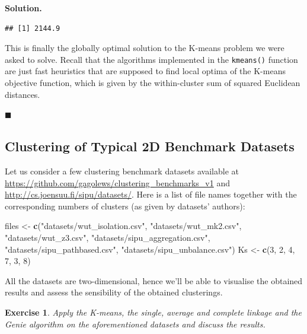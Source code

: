 \documentclass[10pt,b5paper,krantz1]{krantz}
\newenvironment{Shaded}{\begin{snugshade}}{\end{snugshade}}
\newcommand{\DecValTok}[1]{\textcolor[rgb]{0.06,0.06,0.06}{#1}}
\newcommand{\KeywordTok}[1]{\textcolor[rgb]{0.27,0.27,0.27}{\textbf{#1}}}
\newcommand{\NormalTok}[1]{#1}
\newcommand{\StringTok}[1]{\textcolor[rgb]{0.5,0.5,0.5}{#1}}
\newtheorem{exercise}{Exercise}[chapter]
\newenvironment{solution}{%
\bigskip\noindent\textbf{Solution. }%
\it\ignorespaces%
\ignorespaces%
}{\ignorespaces%
\hfill$\blacksquare$%
}
\begin{document}
\begin{solution}
\begin{verbatim}
## [1] 2144.9
\end{verbatim}

This is finally the globally optimal solution to the K-means problem
we were asked to solve. Recall that the algorithms implemented in the \texttt{kmeans()}
function are just fast heuristics that are supposed to find
local optima of the K-means objective function, which is given
by the within-cluster sum of squared Euclidean distances.

\end{solution}

\hypertarget{clustering-of-typical-2d-benchmark-datasets}{%
\subsection{Clustering of Typical 2D Benchmark Datasets}\label{clustering-of-typical-2d-benchmark-datasets}}

Let us consider a few clustering benchmark datasets
available at \url{https://github.com/gagolews/clustering_benchmarks_v1}
and \url{http://cs.joensuu.fi/sipu/datasets/}.
Here is a list of file names together with the
corresponding numbers of clusters (as given by datasets' authors):

\begin{Shaded}
\begin{Highlighting}[]
\NormalTok{files <-}\StringTok{ }\KeywordTok{c}\NormalTok{(}\StringTok{"datasets/wut_isolation.csv"}\NormalTok{,}
           \StringTok{"datasets/wut_mk2.csv"}\NormalTok{,}
           \StringTok{"datasets/wut_z3.csv"}\NormalTok{,}
           \StringTok{"datasets/sipu_aggregation.csv"}\NormalTok{,}
           \StringTok{"datasets/sipu_pathbased.csv"}\NormalTok{,}
           \StringTok{"datasets/sipu_unbalance.csv"}\NormalTok{)}
\NormalTok{Ks <-}\StringTok{ }\KeywordTok{c}\NormalTok{(}\DecValTok{3}\NormalTok{, }\DecValTok{2}\NormalTok{, }\DecValTok{4}\NormalTok{, }\DecValTok{7}\NormalTok{, }\DecValTok{3}\NormalTok{, }\DecValTok{8}\NormalTok{)}
\end{Highlighting}
\end{Shaded}

All the datasets are two-dimensional, hence we'll be able to visualise
the obtained results and assess the sensibility of the obtained clusterings.

\begin{exercise}

Apply the K-means, the single, average and complete linkage
and the Genie algorithm on the aforementioned datasets and discuss the results.

\end{exercise}
\end{document}
